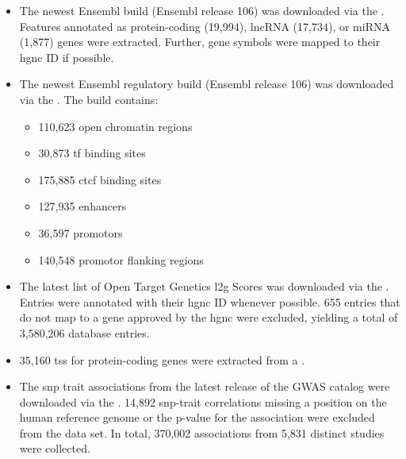 \begin{itemize}
    \item {} The newest Ensembl build (Ensembl release 106) was downloaded via the . Features annotated as protein-coding (19,994), \ac{lncRNA} (17,734), or \ac{miRNA} (1,877) genes were extracted. Further, gene symbols were mapped to their \ac{hgnc} ID if possible.

    \item {} The newest Ensembl regulatory build (Ensembl release 106) was downloaded via the . The build contains:
    \begin{itemize}
        \item 110,623 open chromatin regions
        \item 30,873 \ac{tf} binding sites
        \item 175,885 \ac{ctcf} binding sites
        \item 127,935 enhancers
        \item 36,597 promotors
        \item 140,548 promotor flanking regions
    \end{itemize}

    \item {} The latest list of Open Target Genetics \ac{l2g} Scores was downloaded via the . Entries were annotated with their \ac{hgnc} ID whenever possible. 655 entries that do not map to a gene approved by the \ac{hgnc} were excluded, yielding a total of 3,580,206 database entries.

    \item {} 35,160 \ac{tss} for protein-coding genes were extracted from a .

    \item {} The \ac{snp} trait associations from the latest release of the GWAS catalog were downloaded via the . 14,892 \ac{snp}-trait correlations missing a position on the human reference genome or the p-value for the association were excluded from the data set. In total, 370,002 associations from 5,831 distinct studies were collected.


\end{itemize}
